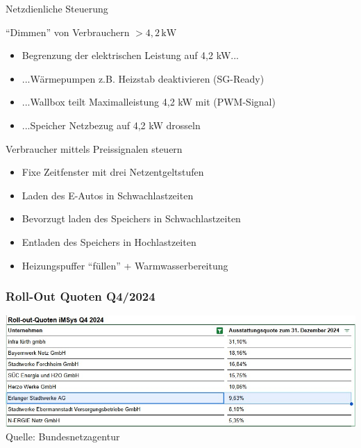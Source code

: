 \begin{frame}{Netzdienliche Steuerung}
   \begin{block}{\enquote{Dimmen} von Verbrauchern $>4,2\,\text{kW}$}
      \begin{itemize}         
         \item Begrenzung der elektrischen Leistung auf 4,2 kW...
         \item ...Wärmepumpen z.B. Heizstab deaktivieren (SG-Ready)
         \item ...Wallbox teilt Maximalleistung 4,2 kW mit (PWM-Signal)
         \item ...Speicher Netzbezug auf 4,2 kW drosseln
      \end{itemize}
   \end{block}
   \begin{block}{Verbraucher mittels Preissignalen steuern}
      \begin{itemize}
         \item Fixe Zeitfenster mit drei Netzentgeltstufen
         \item Laden des E-Autos in Schwachlastzeiten
         \item Bevorzugt laden des Speichers in Schwachlastzeiten
         \item Entladen des Speichers in Hochlastzeiten
         \item Heizungspuffer \enquote{füllen} + Warmwasserbereitung
      \end{itemize}
   \end{block}
   \vspace{0.3cm}
\end{frame}

\begin{frame}
   \frametitle{Roll-Out Quoten Q4/2024}
   \centering
   \includegraphics[width=0.95\paperwidth]{images/Roll-Out-Quoten.jpg}
   Quelle: Bundesnetzagentur\cite{BNetzA2025RolloutQuoten}
\end{frame}
